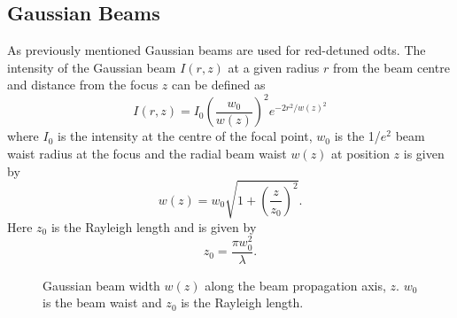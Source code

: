 \subsection{Gaussian Beams}
As previously mentioned Gaussian beams are used for red-detuned \glspl{odt}. The intensity of the Gaussian beam $I(r, z)$ at a given radius $r$ from the beam centre and distance from the focus $z$ can be defined as\cite{saleh_fundamentals_2007}
\begin{equation}
I(r, z) = I_0 \left( \frac{w_0}{w(z)}\right)^2 e^{-2r^2/w(z)^2}
\end{equation}
where $I_0$ is the intensity at the centre of the focal point, $w_0$ is the 1/$e^2$ beam waist radius at the focus and the radial beam waist $w(z)$ at position $z$ is given by
\begin{equation}
w(z) = w_0\sqrt{1 + \left(\frac{z}{z_0} \right)^2}.
\end{equation}
Here $z_0$ is the Rayleigh length and is given by
\begin{equation}
z_0 = \frac{\pi w_0^2}{\lambda}.
\end{equation}

\begin{figure}[h]
\centering
{}

\caption{Gaussian beam width $w(z)$ along the beam propagation axis, $z$. $w_0$ is the beam waist and $z_0$ is the Rayleigh length.}
\end{figure}

